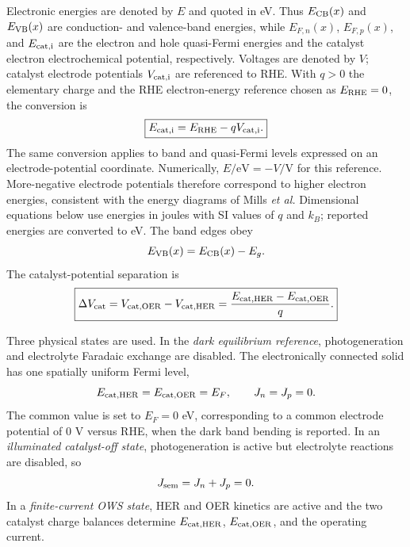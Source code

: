 \documentclass[11pt]{article}
\begin{document}
Electronic energies are denoted by $E$ and quoted in eV. Thus $E_{\rm CB}(x)$ and $E_{\rm VB}(x)$ are conduction- and valence-band energies, while $E_{F,n}(x)$, $E_{F,p}(x)$, and $E_{\rm cat,i}$ are the electron and hole quasi-Fermi energies and the catalyst electron electrochemical potential, respectively. Voltages are denoted by $V$; catalyst electrode potentials $V_{\rm cat,i}$ are referenced to RHE. With $q>0$ the elementary charge and the RHE electron-energy reference chosen as $E_{\rm RHE}=0$, the conversion is
\begin{equation}
\boxed{E_{\rm cat,i}=E_{\rm RHE}-qV_{\rm cat,i}.}
\label{eq:energy-potential-map}
\end{equation}
The same conversion applies to band and quasi-Fermi levels expressed on an electrode-potential coordinate. Numerically, $E/\mathrm{eV}=-V/\mathrm{V}$ for this reference. More-negative electrode potentials therefore correspond to higher electron energies, consistent with the energy diagrams of Mills \textit{et al.}\cite{mills2014} Dimensional equations below use energies in joules with SI values of $q$ and $k_B$; reported energies are converted to eV. The band edges obey
\begin{equation}
E_{\rm VB}(x)=E_{\rm CB}(x)-E_g.
\end{equation}
The catalyst-potential separation is
\begin{equation}
\boxed{\Delta V_{\rm cat}=V_{\rm cat,OER}-V_{\rm cat,HER}
=\frac{E_{\rm cat,HER}-E_{\rm cat,OER}}{q}.}
\label{eq:DeltaEcat}
\end{equation}

Three physical states are used. In the \emph{dark equilibrium reference}, photogeneration and electrolyte Faradaic exchange are disabled. The electronically connected solid has one spatially uniform Fermi level,
\begin{equation}
E_{\rm cat,HER}=E_{\rm cat,OER}=E_F,\qquad J_n=J_p=0.
\end{equation}
The common value is set to $E_F=0$ eV, corresponding to a common electrode potential of 0 V versus RHE, when the dark band bending is reported. In an \emph{illuminated catalyst-off state}, photogeneration is active but electrolyte reactions are disabled, so
\begin{equation}
J_{\rm sem}=J_n+J_p=0.
\label{eq:catalyst-off}
\end{equation}
In a \emph{finite-current OWS state}, HER and OER kinetics are active and the two catalyst charge balances determine $E_{\rm cat,HER}$, $E_{\rm cat,OER}$, and the operating current.
\end{document}
